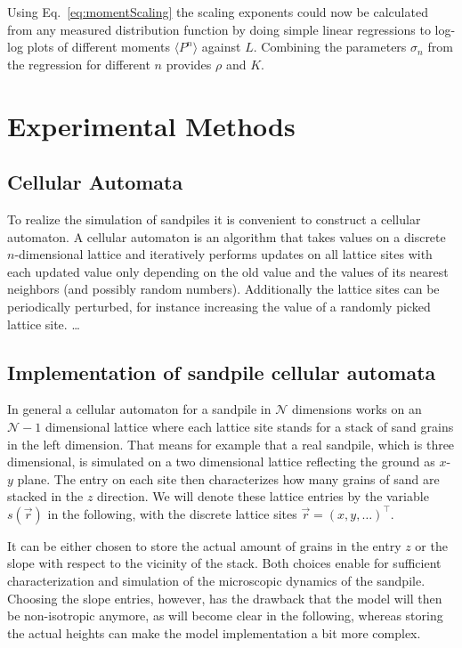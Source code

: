 Using Eq.~\eqref{eq:momentScaling} the scaling exponents could now be calculated from any measured distribution
function by doing simple linear regressions to log-log plots of different moments $\langle P^n\rangle$ against $L$.
Combining the parameters $\sigma_n$ from the regression for different $n$ provides $\rho$ and $K$.

\section{Experimental Methods}
\label{sec:experiment}

\subsection{Cellular Automata}
\label{sec:cellularAutomata}
To realize the simulation of sandpiles it is convenient to construct a cellular automaton.
A cellular automaton is an algorithm that takes values on a discrete $n$-dimensional lattice and iteratively
performs updates on all lattice sites with each updated value only depending on the old value and the values of its
nearest neighbors (and possibly random numbers). Additionally the lattice sites can be periodically perturbed,
for instance increasing the value of a randomly picked lattice site.
\dots%

\subsection{Implementation of sandpile cellular automata}
\label{sec:sandpileImplementation}
In general a cellular automaton for a sandpile in $\mathcal{N}$ dimensions works on an $\mathcal{N}-1$ dimensional
lattice where each lattice site stands for a stack of sand grains in the left dimension. That means for example that
a real sandpile, which is three dimensional, is simulated on a two dimensional lattice reflecting the ground as $x$-$y$
plane. The entry on each site then characterizes how many grains of sand are stacked in the $z$ direction.
We will denote these lattice entries by the variable $s(\vec{r})$ in the following, with the discrete lattice sites
$\vec{r}=(x,y,\ldots)^\top$.

It can be either chosen to store the actual amount of grains in the entry $z$ or the slope with respect to the
vicinity of the stack. Both choices enable for sufficient characterization and simulation of the microscopic
dynamics of the sandpile. Choosing the slope entries, however, has the drawback that the model will then be
non-isotropic anymore, as will become clear in the following, whereas storing the actual heights can make the model
implementation a bit more complex.

